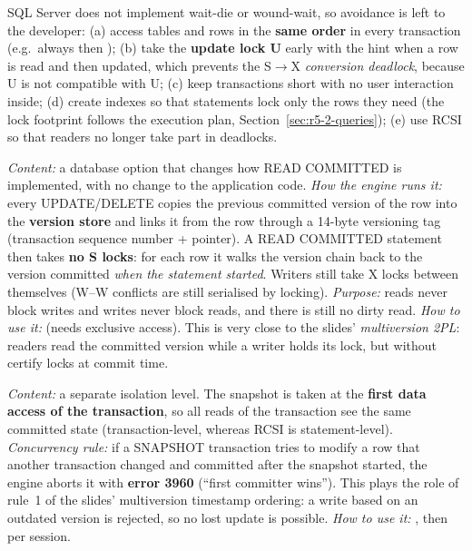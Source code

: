 SQL Server does not implement wait-die or wound-wait, so avoidance is left to the developer: (a) access tables and rows in the \textbf{same order} in every transaction (e.g.\ always  then ); (b) take the \textbf{update lock U} early with the  hint when a row is read and then updated, which prevents the S$\rightarrow$X \emph{conversion deadlock}, because U is not compatible with U; (c) keep transactions short with no user interaction inside; (d) create indexes so that statements lock only the rows they need (the lock footprint follows the execution plan, Section~\ref{sec:r5-2-queries}); (e) use RCSI so that readers no longer take part in deadlocks.

\emph{Content:} a database option that changes how READ COMMITTED is implemented, with no change to the application code. \emph{How the engine runs it:} every UPDATE/DELETE copies the previous committed version of the row into the \textbf{version store} and links it from the row through a 14-byte versioning tag (transaction sequence number + pointer). A READ COMMITTED statement then takes \textbf{no S locks}: for each row it walks the version chain back to the version committed \emph{when the statement started}. Writers still take X locks between themselves (W--W conflicts are still serialised by locking). \emph{Purpose:} reads never block writes and writes never block reads, and there is still no dirty read. \emph{How to use it:}  (needs exclusive access). This is very close to the slides' \emph{multiversion 2PL}: readers read the committed version while a writer holds its lock, but without certify locks at commit time.

\emph{Content:} a separate isolation level. The snapshot is taken at the \textbf{first data access of the transaction}, so all reads of the transaction see the same committed state (transaction-level, whereas RCSI is statement-level). \emph{Concurrency rule:} if a SNAPSHOT transaction tries to modify a row that another transaction changed and committed after the snapshot started, the engine aborts it with \textbf{error 3960} (``first committer wins''). This plays the role of rule~1 of the slides' multiversion timestamp ordering: a write based on an outdated version is rejected, so no lost update is possible. \emph{How to use it:} , then  per session.


